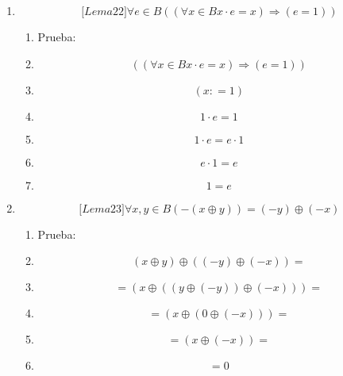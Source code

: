 \begin{enumerate}
\begin{enumerate}
\begin{enumerate}
\begin{enumerate}
        \begin{enumerate}
        \def\labelenumv{\arabic{enumv}.}
        \tightlist
        \item
          Prueba:
        \item
          \[\left( {\left( {\forall{x \in B}{{e \cdot x} = x}} \right)\Rightarrow\left( {e = 1} \right)} \right)\]
        \item
          \[\left( {x{: = 1}} \right)\left( {{e \cdot 1} = 1} \right)\]
        \item
          \[{e \cdot 1} = e\]
        \item
          \[e = 1\]
        \end{enumerate}
      \item
        \[{\lbrack{{Lema}22}\rbrack}\forall{e \in B}\left( {\left( {\forall{x \in B}{{x \cdot e} = x}} \right)\Rightarrow\left( {e = 1} \right)} \right)\]

        \begin{enumerate}
        \def\labelenumv{\arabic{enumv}.}
        \tightlist
        \item
          Prueba:
        \item
          \[\left( {\left( {\forall{x \in B}{{x \cdot e} = x}} \right)\Rightarrow\left( {e = 1} \right)} \right)\]
        \item
          \[\left( {x{: = 1}} \right)\]
        \item
          \[{1 \cdot e} = 1\]
        \item
          \[{1 \cdot e} = {e \cdot 1}\]
        \item
          \[{e \cdot 1} = e\]
        \item
          \[1 = e\]
        \end{enumerate}
      \item
        \[{\lbrack{{Lema}23}\rbrack}\forall x,{y \in B}{\left( {- \left( {x \oplus y} \right)} \right) = \left( {- y} \right)} \oplus \left( {- x} \right)\]

        \begin{enumerate}
        \def\labelenumv{\arabic{enumv}.}
        \tightlist
        \item
          Prueba:
        \item
          \[\left( {x \oplus y} \right) \oplus {\left( {\left( {- y} \right) \oplus \left( {- x} \right)} \right) =}\]
        \item
          \[{= \left( {x \oplus \left( {\left( {y \oplus \left( {- y} \right)} \right) \oplus \left( {- x} \right)} \right)} \right)} =\]
        \item
          \[{= \left( {x \oplus \left( {0 \oplus \left( {- x} \right)} \right)} \right)} =\]
        \item
          \[{= \left( {x \oplus \left( {- x} \right)} \right)} =\]
        \item
          \[= 0\]
        \end{enumerate}
      \end{enumerate}


\end{enumerate}
\end{enumerate}
\end{enumerate}
